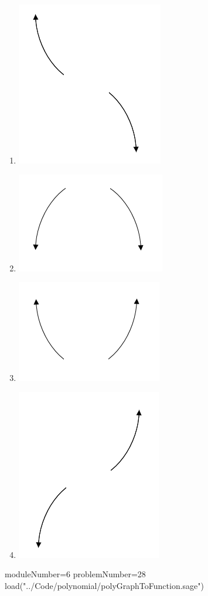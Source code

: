 \documentclass[14pt]{article}
\begin{document}
\begin{enumerate}
{\begin{multicols}{4}
	\begin{enumerate}[label=\Alph*.]
		\item \begin{center} \includegraphics[width=.2\textwidth]{../Figures/endBehaviorNegativeOddC} \end{center}
    \columnbreak
		\item \begin{center} \includegraphics[width=.2\textwidth]{../Figures/endBehaviorNegativeEvenC}\end{center}
    \columnbreak
		\item \begin{center} \includegraphics[width=.2\textwidth]{../Figures/endBehaviorPositiveEvenC}\end{center}
    \columnbreak
		\item \begin{center} \includegraphics[width=.2\textwidth]{../Figures/endBehaviorPositiveOddC}\end{center}
	\end{enumerate}
\end{multicols}
}

\begin{sagesilent}
moduleNumber=6
problemNumber=28
load("../Code/polynomial/polyGraphToFunction.sage")
\end{sagesilent}


\end{enumerate}
\end{document}
